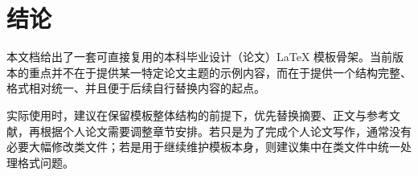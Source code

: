 \chapter{结论}

本文档给出了一套可直接复用的本科毕业设计（论文）LaTeX 模板骨架。当前版本的重点并不在于提供某一特定论文主题的示例内容，而在于提供一个结构完整、格式相对统一、并且便于后续自行替换内容的起点。

实际使用时，建议在保留模板整体结构的前提下，优先替换摘要、正文与参考文献，再根据个人论文需要调整章节安排。若只是为了完成个人论文写作，通常没有必要大幅修改类文件；若是用于继续维护模板本身，则建议集中在类文件中统一处理格式问题。
